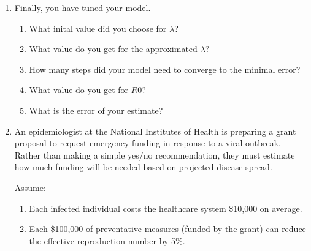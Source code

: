 \documentclass[11pt]{article}
\begin{document}
\begin{enumerate}
\begin{enumerate}
\end{enumerate}
\vspace{4cm}



\newpage

\item Finally, you have tuned your model.
    \begin{enumerate}
    \item[(a)] What inital value did you choose for  $\lambda$? 
    \vspace{3cm}
    
    \item[(b)] What value do you get for the approximated $\lambda$? 
    \vspace{3cm}
    
    \item[(c)] How many steps did your model need to converge to the minimal error?
    \vspace{3cm}
    
    \item[(d)] What value do you get for $R0$? 
    \vspace{3cm}
    
    \item[(e)] What is the error of your estimate?
    \vspace{3cm}

    \end{enumerate}




    
\newpage
\item An epidemiologist at the National Institutes of Health is preparing a grant proposal to request emergency funding in response to a viral outbreak. Rather than making a simple yes/no recommendation, they must estimate how much funding will be needed based on projected disease spread.


Assume:
\begin{enumerate}
    \item Each infected individual costs the healthcare system \$10{,}000 on average.
    \item Each \$100{,}000 of preventative measures (funded by the grant) can reduce the effective reproduction number by 5\%.
\end{enumerate}
    \vspace{0.5cm}


\end{enumerate}
\end{document}
